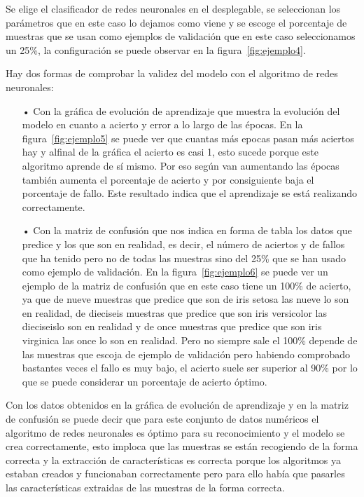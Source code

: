 \documentclass[a4paper, 12pt]{book}
\begin{document}
Se elige el clasificador de redes neuronales en el desplegable, se seleccionan los parámetros que en este caso lo dejamos como viene y se escoge el porcentaje de muestras que se usan como ejemplos de validación que en este caso seleccionamos un 25\%, la configuración se puede observar en la figura~\ref{fig:ejemplo4}.

Hay dos formas de comprobar la validez del modelo con el algoritmo de redes neuronales:

\begin{itemize}
 \item[•] Con la gráfica de evolución de aprendizaje que muestra la evolución del modelo en cuanto a acierto y error a lo largo de las épocas. En la figura~\ref{fig:ejemplo5} se puede ver que cuantas más epocas pasan más aciertos hay y alfinal de la gráfica el acierto es casi 1, esto sucede porque este algoritmo aprende de sí mismo.
Por eso según van aumentando las épocas también aumenta el porcentaje de acierto y por consiguiente baja el porcentaje de fallo. Este resultado indica que el aprendizaje se está realizando correctamente.
 \item[•] Con la matriz de confusión que nos indica en forma de tabla los datos que predice y los que son en realidad, es decir, el número de aciertos y de fallos que ha tenido pero no de todas las muestras sino del 25\% que se han usado como ejemplo de validación. 
En la figura~\ref{fig:ejemplo6} se puede ver un ejemplo de la matriz de confusión que en este caso tiene un 100\% de acierto, ya que de nueve muestras que predice que son de iris setosa las nueve lo son en realidad, de dieciseis muestras que predice que son iris versicolor las dieciseislo son en realidad y de once muestras que predice que son iris virginica las once lo son en realidad.
Pero no siempre sale el 100\% depende de las muestras que escoja de ejemplo de validación pero habiendo comprobado bastantes veces el fallo es muy bajo, el acierto suele ser superior al 90\% por lo que se puede considerar un porcentaje de acierto óptimo.
 \end{itemize} 

Con los datos obtenidos en la gráfica de evolución de aprendizaje y en la matriz de confusión se puede decir que para este conjunto de datos numéricos el algoritmo de redes neuronales es óptimo para su reconocimiento y el modelo se crea correctamente, esto imploca que las muestras se están recogiendo de la forma correcta y la extracción de características es correcta porque los algoritmos ya estaban creados y funcionaban correctamente pero para ello había que pasarles las características extraidas de las muestras de la forma correcta.
\end{document}
